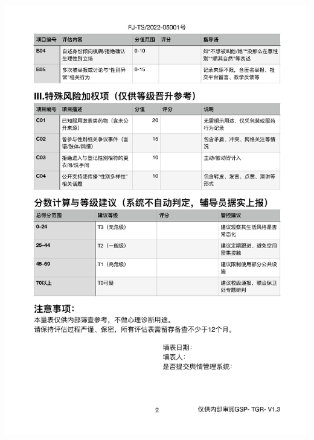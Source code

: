 \documentclass[]{ctexrep}
\begin{document}
	\includegraphics[scale=0.6]{./附件1正文_页面_2.png}
	
\end{document}
